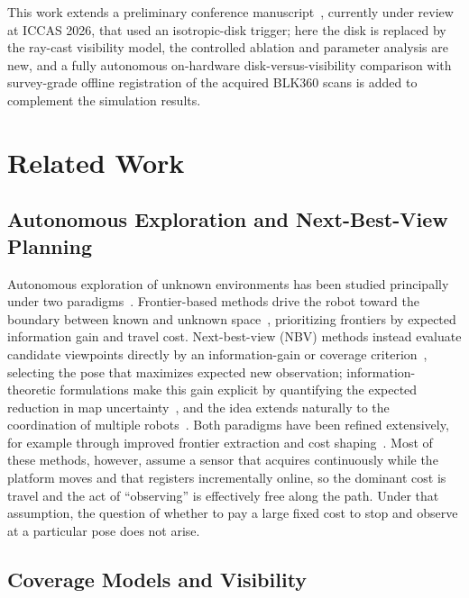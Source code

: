 \documentclass[sensors,article,submit,pdftex,moreauthors]{Definitions/mdpi}
\begin{document}
This work extends a preliminary conference manuscript~\cite{iccas2026}, currently
under review at ICCAS 2026, that used an isotropic-disk trigger; here the disk is replaced by the ray-cast visibility
model, the controlled ablation and parameter analysis are new, and a fully
autonomous on-hardware disk-versus-visibility comparison with survey-grade
offline registration of the acquired BLK360 scans is added to complement the
simulation results.

\section{Related Work}

\subsection{Autonomous Exploration and Next-Best-View Planning}

Autonomous exploration of unknown environments has been studied principally
under two paradigms~\cite{placed2023,lluvia2021}. Frontier-based methods drive
the robot toward the boundary between known and unknown
space~\cite{yamauchi1997,umari2017}, prioritizing frontiers by expected
information gain and travel cost. Next-best-view (NBV) methods instead evaluate
candidate viewpoints directly by an information-gain or coverage
criterion~\cite{connolly1985,bircher2016}, selecting the pose that maximizes
expected new observation; information-theoretic formulations make this gain
explicit by quantifying the expected reduction in map
uncertainty~\cite{stachniss2005}, and the idea extends naturally to the
coordination of multiple robots~\cite{burgard2005}. Both paradigms have been
refined extensively, for example through improved frontier extraction and cost
shaping~\cite{he2025,quin2021}. Most of these methods, however, assume a sensor
that acquires continuously while the platform moves and that registers
incrementally online, so the dominant cost is travel and the act of ``observing''
is effectively free along the path. Under that assumption, the question of
whether to pay a large fixed cost to stop and observe at a particular pose does
not arise.

\subsection{Coverage Models and Visibility}
\end{document}

